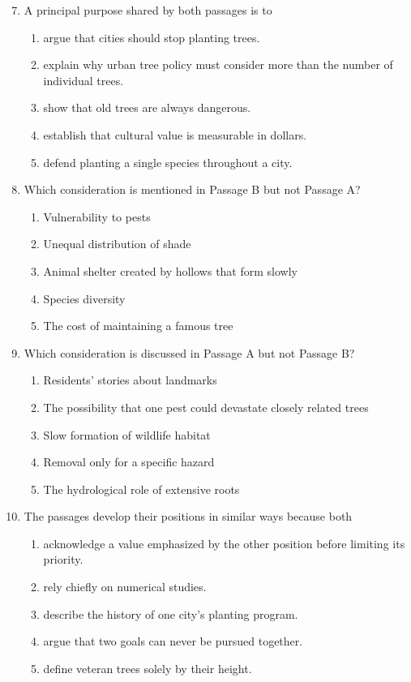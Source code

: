 \begin{enumerate}
\setcounter{enumi}{6}

\item A principal purpose shared by both passages is to
\begin{enumerate}
\item[(A)] argue that cities should stop planting trees.
\item[(B)] explain why urban tree policy must consider more than the number of individual trees.
\item[(C)] show that old trees are always dangerous.
\item[(D)] establish that cultural value is measurable in dollars.
\item[(E)] defend planting a single species throughout a city.
\end{enumerate}

\item Which consideration is mentioned in Passage B but not Passage A?
\begin{enumerate}
\item[(A)] Vulnerability to pests
\item[(B)] Unequal distribution of shade
\item[(C)] Animal shelter created by hollows that form slowly
\item[(D)] Species diversity
\item[(E)] The cost of maintaining a famous tree
\end{enumerate}

\item Which consideration is discussed in Passage A but not Passage B?
\begin{enumerate}
\item[(A)] Residents' stories about landmarks
\item[(B)] The possibility that one pest could devastate closely related trees
\item[(C)] Slow formation of wildlife habitat
\item[(D)] Removal only for a specific hazard
\item[(E)] The hydrological role of extensive roots
\end{enumerate}

\item The passages develop their positions in similar ways because both
\begin{enumerate}
\item[(A)] acknowledge a value emphasized by the other position before limiting its priority.
\item[(B)] rely chiefly on numerical studies.
\item[(C)] describe the history of one city's planting program.
\item[(D)] argue that two goals can never be pursued together.
\item[(E)] define veteran trees solely by their height.
\end{enumerate}


\end{enumerate}
